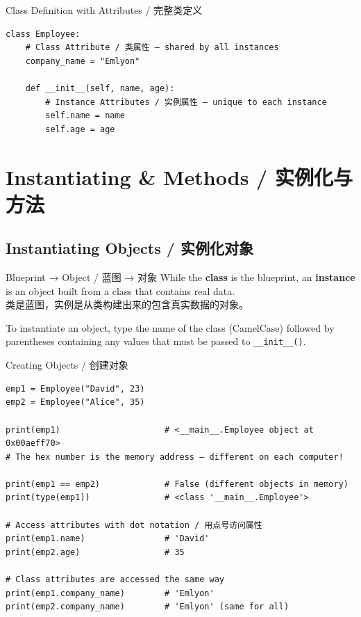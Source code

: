 \documentclass[11pt,a4paper]{report}
\let\oldtexttt\texttt
\renewcommand{\texttt}[1]{\textcolor{mainblue}{\oldtexttt{#1}}}
\begin{document}
\begin{examplebox}{Class Definition with Attributes / 完整类定义}
\begin{lstlisting}
class Employee:
    # Class Attribute / 类属性 — shared by all instances
    company_name = "Emlyon"

    def __init__(self, name, age):
        # Instance Attributes / 实例属性 — unique to each instance
        self.name = name
        self.age = age
\end{lstlisting}
\end{examplebox}

\section{Instantiating \& Methods / 实例化与方法}

\subsection{Instantiating Objects / 实例化对象}

\begin{concept}{Blueprint → Object / 蓝图 → 对象}
    While the \textbf{class} is the blueprint, an \textbf{instance} is an object built from a class that contains real data. \\
    类是蓝图，实例是从类构建出来的包含真实数据的对象。

    To instantiate an object, type the name of the class (CamelCase) followed by parentheses containing any values that must be passed to \texttt{\_\_init\_\_()}.
\end{concept}

\begin{examplebox}{Creating Objects / 创建对象}
\begin{lstlisting}
emp1 = Employee("David", 23)
emp2 = Employee("Alice", 35)

print(emp1)                     # <__main__.Employee object at 0x00aeff70>
# The hex number is the memory address — different on each computer!

print(emp1 == emp2)             # False (different objects in memory)
print(type(emp1))               # <class '__main__.Employee'>

# Access attributes with dot notation / 用点号访问属性
print(emp1.name)                # 'David'
print(emp2.age)                 # 35

# Class attributes are accessed the same way
print(emp1.company_name)        # 'Emlyon'
print(emp2.company_name)        # 'Emlyon' (same for all)
\end{lstlisting}
\end{examplebox}
\end{document}
